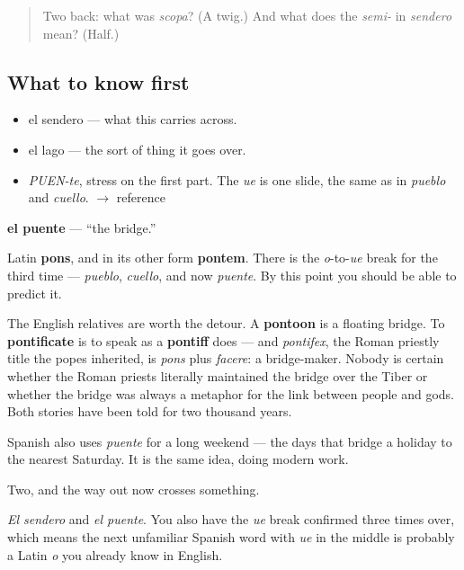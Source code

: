 \label{lesson:ES-C295-puente}



\begin{quote}
Two back: what was \emph{scopa}? (A twig.) And what does the \emph{semi-} in \emph{sendero} mean? (Half.)
\end{quote}

\subsection*{What to know first}
\begin{itemize}
\raggedright
  \item el sendero — what this carries across.
  \item el lago — the sort of thing it goes over.
\end{itemize}

\begin{sounds}
\begin{itemize}
\raggedright
  \item \emph{PUEN-te}, stress on the first part. The \emph{ue} is one slide, the same as in \emph{pueblo} and \emph{cuello}. $\to$ reference
\end{itemize}
\end{sounds}

\begin{cousinweb}
\textbf{el puente} — \textquotedblleft{}the bridge.\textquotedblright{}

Latin \textbf{pons}, and in its other form \textbf{pontem}. There is the \emph{o}-to-\emph{ue} break for the third time — \emph{pueblo}, \emph{cuello}, and now \emph{puente}. By this point you should be able to predict it.

The English relatives are worth the detour. A \textbf{pontoon} is a floating bridge. To \textbf{pontificate} is to speak as a \textbf{pontiff} does — and \emph{pontifex}, the Roman priestly title the popes inherited, is \emph{pons} plus \emph{facere}: a bridge-maker. Nobody is certain whether the Roman priests literally maintained the bridge over the Tiber or whether the bridge was always a metaphor for the link between people and gods. Both stories have been told for two thousand years.

Spanish also uses \emph{puente} for a long weekend — the days that bridge a holiday to the nearest Saturday. It is the same idea, doing modern work.
\end{cousinweb}

\begin{grammarlens}[title={What you've built}]
Two, and the way out now crosses something.

\emph{El sendero} and \emph{el puente}. You also have the \emph{ue} break confirmed three times over, which means the next unfamiliar Spanish word with \emph{ue} in the middle is probably a Latin \emph{o} you already know in English.
\end{grammarlens}

